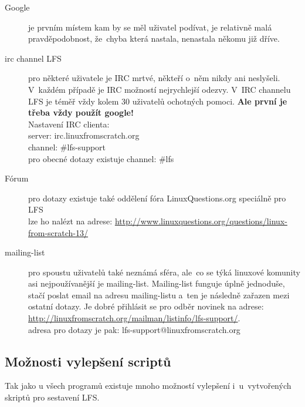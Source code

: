 \documentclass[a4paper,12pt]{article}
\renewcommand{\b}[1]{\textbf{#1}} %
\begin{document}
\begin{description}
 \item[Google] je prvním místem kam by se měl uživatel podívat, je relativně malá pravděpodobnost, že~chyba která nastala, nenastala někomu již dříve.
 \item[irc channel LFS] pro některé uživatele je IRC mrtvé, někteří o~něm nikdy ani neslyšeli. V~každém případě je IRC možností nejrychlejší odezvy. V~IRC channelu LFS je téměř vždy kolem 30 uživatelů ochotných pomoci. \b{Ale první je třeba vždy použít google!}\\
Nastavení IRC clienta:\\
server: irc.linuxfromscratch.org\\
channel: \#lfs-support\\
pro obecné dotazy existuje channel: \#lfs\\
 \item[Fórum] pro dotazy existuje také oddělení fóra LinuxQuestions.org speciálně pro LFS\\
  lze ho nalézt na adrese: \href{http://www.linuxquestions.org/questions/linux-from-scratch-13/}{http://www.linuxquestions.org/questions/linux-from-scratch-13/}
 \item[mailing-list] pro spoustu uživatelů také neznámá sféra, ale~co se týká linuxové komunity asi nejpoužívanější je mailing-list. Mailing-list funguje úplně jednoduše, stačí poslat email na adresu mailing-listu a~ten je následně zařazen mezi ostatní dotazy. Je dobré přihlásit se pro odběr novinek na adrese:\\ \href{http://linuxfromscratch.org/mailman/listinfo/lfs-support/}{http://linuxfromscratch.org/mailman/listinfo/lfs-support/}.\\
adresa pro dotazy je pak: lfs-support@linuxfromscratch.org
 \end{description}

\subsection{Možnosti vylepšení scriptů}
Tak jako u všech programů existuje mnoho možností vylepšení i~u~vytvořených skriptů pro sestavení LFS.\\
\end{document}
